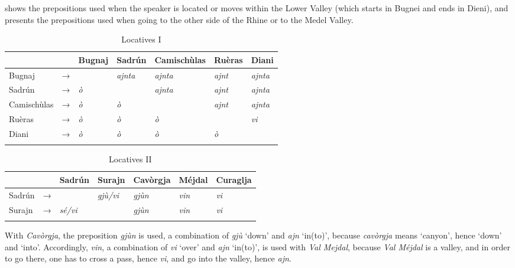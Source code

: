  shows the prepositions used when the speaker is located or moves within the Lower Valley (which starts in Bugnei and ends in Dieni), and  presents the prepositions used when going to the other side of the Rhine or to the Medel Valley.

\begin{table}
	\caption{Locatives I}
	\label{loc1}
	\begin{tabular}{lllllll}
		\lsptoprule
		& & Bugnaj & Sadrún & Camischùlas & Ruèras & Diani \\
		\midrule
		Bugnaj  & →& \longrule  & \textit{ajnta} & \textit{ajnta} & \textit{ajnt} & \textit{ajnta}\\
		Sadrún & → & \textit{ò}  & \longrule & \textit{ajnta} & \textit{ajnt} & \textit{ajnta}\\
		Camischùlas & →& \textit{ò} & \textit{ò} & \longrule & \textit{ajnt} & \textit{ajnta}\\
		Ruèras & →& \textit{ò} & \textit{ò} & \textit{ò} & \longrule & \textit{vi}\\
		Diani & →& \textit{ò} & \textit{ò} & \textit{ò} & \textit{ò} & \longrule\\
		\lspbottomrule
	\end{tabular}
\end{table}

\begin{table}
	\caption{Locatives II}
	\label{loc2}
	\begin{tabular}{lllllll}
		\lsptoprule
		& & Sadrún & Surajn & Cavòrgja & Méjdal & Curaglja\\ 
		\midrule
		Sadrún  &    →& \longrule & \textit{gjù/vi}  & \textit{gjùn}    & \textit{vin} & \textit{vi}\\
		Surajn  &   → &  \textit{sé/vi} & \longrule & \textit{gjùn}    & \textit{vin} & \textit{vi}   \\
		\lspbottomrule
	\end{tabular}
\end{table}

With \textit{Cavòrgja}, the preposition \textit{gjùn} is used, a combination of \textit{gjù} `down' and \textit{ajn} `in(to)',  because \textit{cavòrgja} means `canyon', hence `down' and `into'. Accordingly, \textit{vin}, a combination of \textit{vi} `over' and \textit{ajn} `in(to)', is used with \textit{Val Mejdal}, because \textit{Val Méjdal} is a valley, and in order to go there, one has to cross a pass, hence \textit{vi}, and go into the valley, hence \textit{ajn}.

